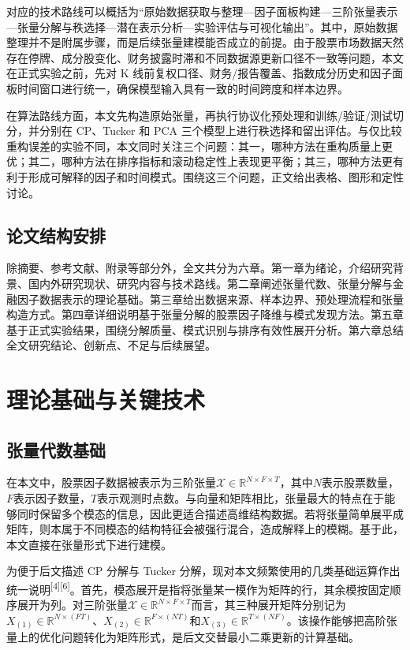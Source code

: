 对应的技术路线可以概括为“原始数据获取与整理—因子面板构建—三阶张量表示—张量分解与秩选择—潜在表示分析—实验评估与可视化输出”。其中，原始数据整理并不是附属步骤，而是后续张量建模能否成立的前提。由于股票市场数据天然存在停牌、成分股变化、财务披露时滞和不同数据源更新口径不一致等问题，本文在正式实验之前，先对 K 线前复权口径、财务/报告覆盖、指数成分历史和因子面板时间窗口进行统一，确保模型输入具有一致的时间跨度和样本边界。

在算法路线方面，本文先构造原始张量，再执行协议化预处理和训练/验证/测试切分，并分别在 CP、Tucker 和 PCA 三个模型上进行秩选择和留出评估。与仅比较重构误差的实验不同，本文同时关注三个问题：其一，哪种方法在重构质量上更优；其二，哪种方法在排序指标和滚动稳定性上表现更平衡；其三，哪种方法更有利于形成可解释的因子和时间模式。围绕这三个问题，正文给出表格、图形和定性讨论。

\section{论文结构安排}

除摘要、参考文献、附录等部分外，全文共分为六章。第一章为绪论，介绍研究背景、国内外研究现状、研究内容与技术路线。第二章阐述张量代数、张量分解与金融因子数据表示的理论基础。第三章给出数据来源、样本边界、预处理流程和张量构造方式。第四章详细说明基于张量分解的股票因子降维与模式发现方法。第五章基于正式实验结果，围绕分解质量、模式识别与排序有效性展开分析。第六章总结全文研究结论、创新点、不足与后续展望。

\chapter{理论基础与关键技术}

\section{张量代数基础}

在本文中，股票因子数据被表示为三阶张量$\mathcal{X}\in\mathbb{R}^{N\times F\times T}$，其中$N$表示股票数量，$F$表示因子数量，$T$表示观测时点数。与向量和矩阵相比，张量最大的特点在于能够同时保留多个模态的信息，因此更适合描述高维结构数据。若将张量简单展平成矩阵，则本属于不同模态的结构特征会被强行混合，造成解释上的模糊。基于此，本文直接在张量形式下进行建模。

为便于后文描述 CP 分解与 Tucker 分解，现对本文频繁使用的几类基础运算作出统一说明\textsuperscript{[4][6]}。首先，模态展开是指将张量某一模作为矩阵的行，其余模按固定顺序展开为列。对三阶张量$\mathcal{X}\in\mathbb{R}^{N\times F\times T}$而言，其三种展开矩阵分别记为$X_{(1)}\in\mathbb{R}^{N\times (FT)}$、$X_{(2)}\in\mathbb{R}^{F\times (NT)}$和$X_{(3)}\in\mathbb{R}^{T\times (NF)}$。该操作能够把高阶张量上的优化问题转化为矩阵形式，是后文交替最小二乘更新的计算基础。

